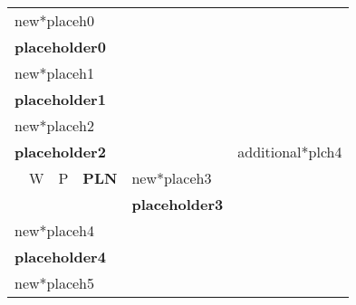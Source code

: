 \documentclass{article}
\begin{document}
\begin{table}[h]
{\setlength{\tabcolsep}{0.5em}
\begin{tabularx}{\textwidth}{|Xccll|c|}
\hline
\multicolumn{5}{|l|}{new*placeh0}                                                                                    & \multirow{22}{*}{ \begin{sideways}additional*plch4\end{sideways}} \\
\multicolumn{5}{|l|}{\textbf{placeholder0}}                                                                                                  &                                             \\
\multicolumn{5}{|l|}{new*placeh1}                                                                                &                                             \\
\multicolumn{5}{|l|}{\textbf{placeholder1}}                                                                                                  &                                             \\ \cline{1-5}
\multicolumn{5}{|l|}{new*placeh2}                                                                              &                                             \\
\multicolumn{5}{|l|}{\textbf{placeholder2}}                                                                                                  &                                             \\ \cline{2-3} \cline{5-5}
 & \multicolumn{1}{|l|}{W}      & \multicolumn{1}{l|}{P}      & \multicolumn{1}{X|}{\centering \textbf{PLN}}      & new*placeh3                    &                                             \\ \cline{2-3}
&                             &                             & \multicolumn{1}{l|}{}                  &  \textbf{placeholder3}                &                                             \\ \cline{1-5}
\multicolumn{5}{|l|}{new*placeh4}                                                                         &                                             \\
\multicolumn{5}{|l|}{\textbf{placeholder4}}                                                                                                  &                                             \\
\multicolumn{5}{|l|}{new*placeh5}                                                                               &                                             \\

\end{tabularx}}
\end{table}
\end{document}
